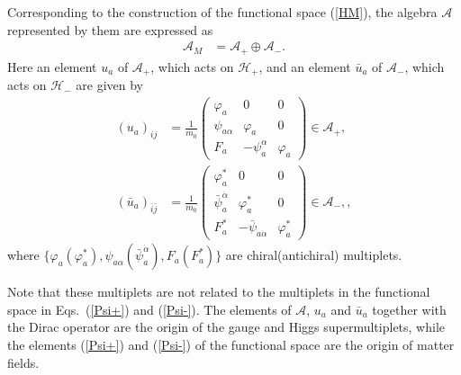 \documentclass{ptephy}%
\begin{document}
Corresponding to the construction of the functional space (\ref{HM}), 
the algebra $\mathcal{A}$ represented by them are expressed as
\begin{align}
\mathcal{A}_M & = \mathcal{A}_+ \oplus \mathcal{A}_-.
\end{align}
Here an element $u_a$ of $\mathcal{A_+}$, which acts on
 $\mathcal{H}_+$,
 and an element $\bar{u}_a$ of 
$\mathcal{A}_-$, which acts on $\mathcal{H}_-$ are given by 
\begin{align}
(u_a)_{ij} & = \frac{1}{m_0}
\begin{pmatrix}
\varphi_a & 0 & 0\\
\psi_{a\alpha} & \varphi_a & 0 \\
F_a & -\psi_a^\alpha & \varphi_a
\end{pmatrix} \in \mathcal{A}_+, 
\label{ua}
\\
(\bar{u}_a)_{\bar{i}\bar{j}} & = \frac{1}{m_0}
\begin{pmatrix}
\varphi_a^\ast & 0 & 0\\
\bar{\psi}_a^{\dot{\alpha}} & \varphi_a^\ast & 0 \\
 F_a^\ast & -\bar{\psi}_{a\dot{\alpha}} & \varphi_a^\ast
\end{pmatrix} \in \mathcal{A}_-, \label{barua},
\end{align}
where $\{\varphi_a(\varphi_a^\ast), \psi_{a\alpha}(\bar{\psi}_a^{\dot{\alpha}}),F_a(F_a^\ast)\}$
are chiral(antichiral) multiplets.

Note that these multiplets are not related to the multiplets
in the functional space in Eqs.~(\ref{Psi+}) and (\ref{Psi-}).
The elements of $\mathcal{A}$, 
$u_a$ and $\bar{u}_a$ together with the Dirac operator are 
the origin of the gauge and Higgs supermultiplets, while the 
elements (\ref{Psi+}) and (\ref{Psi-})
of the functional space are the origin of matter fields.
\end{document}
